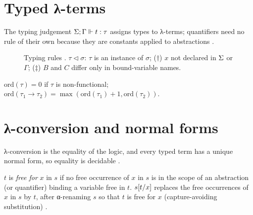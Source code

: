 \section{Typed λ-terms}\label{sec:rules-typing}

The typing judgement $\Sigma;\Gamma\Vdash t:\tau$ assigns types to λ-terms; quantifiers need no rule of their own because they are constants applied to abstractions .

\begin{figure}[htbp]
\small
{}
\caption{Typing rules . $\tau\triangleleft\sigma$: $\tau$ is an instance of $\sigma$; ($\dagger$) $x$ not declared in $\Sigma$ or $\Gamma$; ($\ddagger$) $B$ and $C$ differ only in bound-variable names.}\label{fig:rules-typing}
\end{figure}

\begin{definition}\label{def:rules-order}
$\mathrm{ord}(\tau)=0$ if $\tau$ is non-functional; $\mathrm{ord}(\tau_1\to\tau_2)=\max(\mathrm{ord}(\tau_1)+1,\mathrm{ord}(\tau_2))$.
\end{definition}

\section{λ-conversion and normal forms}\label{sec:rules-conversion}

λ-conversion is the equality of the logic, and every typed term has a unique normal form, so equality is decidable .

\begin{definition}\label{def:rules-freefor}
$t$ is \emph{free for} $x$ in $s$ if no free occurrence of $x$ in $s$ is in the scope of an abstraction (or quantifier) binding a variable free in $t$.
$s[t/x]$ replaces the free occurrences of $x$ in $s$ by $t$, after α-renaming $s$ so that $t$ is free for $x$ (capture-avoiding substitution) .
\end{definition}

